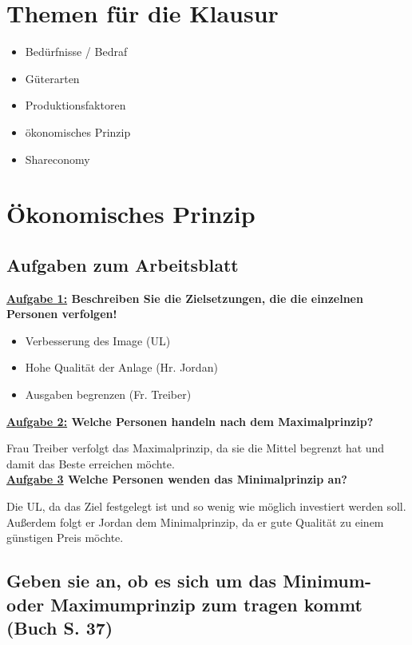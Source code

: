 \documentclass[a4paper,11pt]{scrartcl}		%
\author{Lars Friedrichsen}
\date{\today}
\begin{document}
\section{Themen für die Klausur}

	\begin{itemize}
		\item Bedürfnisse / Bedraf
		\item Güterarten
		\item Produktionsfaktoren
		\item ökonomisches Prinzip
		\item Shareconomy
	\end{itemize}

\section{Ökonomisches Prinzip}

	\subsection{Aufgaben zum Arbeitsblatt}

	\textbf{\underline{Aufgabe 1:} Beschreiben Sie die Zielsetzungen, die die einzelnen Personen verfolgen!}

		\begin{itemize}
			\item Verbesserung des Image (UL)
			\item Hohe Qualität der Anlage (Hr. Jordan)
			\item Ausgaben begrenzen (Fr. Treiber)
		\end{itemize}

	\textbf{\underline{Aufgabe 2:} Welche Personen handeln nach dem Maximalprinzip?}\par
	Frau Treiber verfolgt das Maximalprinzip, da sie die Mittel begrenzt hat und damit das Beste erreichen möchte.\\[0.5cm]

	\textbf{\underline{Aufgabe 3} Welche Personen wenden das Minimalprinzip an?}\par
	Die UL, da das Ziel festgelegt ist und so wenig wie möglich investiert werden soll. Außerdem folgt er Jordan dem 
	Minimalprinzip, da er gute Qualität zu einem günstigen Preis möchte.

	\subsection{Geben sie an, ob es sich um das Minimum- oder Maximumprinzip zum tragen kommt (Buch S. 37)}
\end{document}
